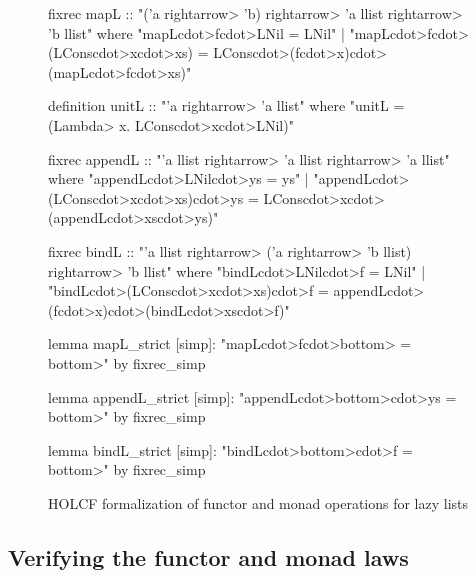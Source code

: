 \begin{figure}
\begin{isacode}
fixrec mapL :: "('a \<rightarrow> 'b) \<rightarrow> 'a llist \<rightarrow> 'b llist"
  where "mapL\<cdot>f\<cdot>LNil = LNil"
  | "mapL\<cdot>f\<cdot>(LCons\<cdot>x\<cdot>xs) = LCons\<cdot>(f\<cdot>x)\<cdot>(mapL\<cdot>f\<cdot>xs)"
\end{isacode}
\unmedskip
{}
\begin{isacode}
definition unitL :: "'a \<rightarrow> 'a llist"
  where "unitL = (\<Lambda> x. LCons\<cdot>x\<cdot>LNil)"
\end{isacode}
\unmedskip
{}
\begin{isacode}
fixrec appendL :: "'a llist \<rightarrow> 'a llist \<rightarrow> 'a llist"
  where "appendL\<cdot>LNil\<cdot>ys = ys"
  | "appendL\<cdot>(LCons\<cdot>x\<cdot>xs)\<cdot>ys = LCons\<cdot>x\<cdot>(appendL\<cdot>xs\<cdot>ys)"
\end{isacode}
\unmedskip
{}
\begin{isacode}
fixrec bindL :: "'a llist \<rightarrow> ('a \<rightarrow> 'b llist) \<rightarrow> 'b llist"
  where "bindL\<cdot>LNil\<cdot>f = LNil"
  | "bindL\<cdot>(LCons\<cdot>x\<cdot>xs)\<cdot>f = appendL\<cdot>(f\<cdot>x)\<cdot>(bindL\<cdot>xs\<cdot>f)"
\end{isacode}
\unmedskip
{}
\begin{isacode}
lemma mapL_strict [simp]: "mapL\<cdot>f\<cdot>\<bottom> = \<bottom>"
  by fixrec_simp
\end{isacode}
\unmedskip
{}
\begin{isacode}
lemma appendL_strict [simp]: "appendL\<cdot>\<bottom>\<cdot>ys = \<bottom>"
  by fixrec_simp
\end{isacode}
\unmedskip
{}
\begin{isacode}
lemma bindL_strict [simp]: "bindL\<cdot>\<bottom>\<cdot>f = \<bottom>"
  by fixrec_simp
\end{isacode}
\caption{HOLCF formalization of functor and monad operations for lazy lists}
\label{fig:case-list-holcf}
\end{figure}

\subsection{Verifying the functor and monad laws}
\label{sec:case-llist-monad}

